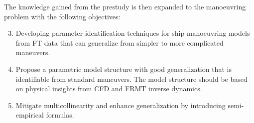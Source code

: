 \vspace{0.1 cm}
\noindent The knowledge gained from the prestudy is then expanded to the manoeuvring problem with the following objectives: 
\begin{enumerate}[label=(\Alph*),itemsep=1mm]
    \setcounter{enumi}{2}

    \item Developing parameter identification techniques for ship manoeuvring models from FT data that can generalize from simpler to more complicated maneuvers.

    \item Propose a parametric model structure with good generalization that is identifiable from standard maneuvers. The model structure should be based on physical insights from CFD and FRMT inverse dynamics.

    \item Mitigate multicollinearity and enhance generalization by introducing semi-empirical formulas.
    
\end{enumerate}
